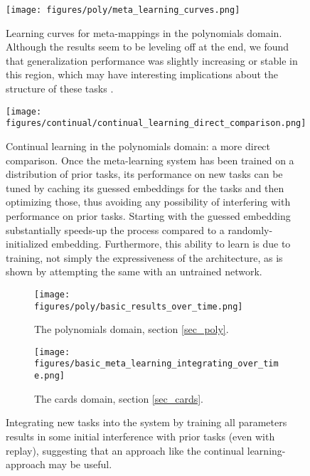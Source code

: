 \begin{figure}[H]
\centering
\texttt{[image: figures/poly/meta\_learning\_curves.png]}
\caption{Learning curves for meta-mappings in the polynomials domain. Although the results seem to be leveling off at the end, we found that generalization performance was slightly increasing or stable in this region, which may have interesting implications about the structure of these tasks \citep{Lampinen2019}.}
\label{supp_poly_meta_learning_curves}
\end{figure}

\begin{figure}[H]
\centering
\texttt{[image: figures/continual/continual\_learning\_direct\_comparison.png]}
\caption{Continual learning in the polynomials domain: a more direct comparison. Once the meta-learning system has been trained on a distribution of prior tasks, its performance on new tasks can be tuned by caching its guessed embeddings for the tasks and then optimizing those, thus avoiding any possibility of interfering with performance on prior tasks. Starting with the guessed embedding substantially speeds-up the process compared to a randomly-initialized embedding. Furthermore, this ability to learn is due to training, not simply the expressiveness of the architecture, as is shown by attempting the same with an untrained network.}
\label{supp_poly_continual_results}
\end{figure}

\begin{figure}[H]
\centering
\begin{subfigure}[t]{0.5\textwidth}
\texttt{[image: figures/poly/basic\_results\_over\_time.png]}
\caption{The polynomials domain, section \ref{sec_poly}.}
\label{supp_poly_integration_results}
\end{subfigure}%
\begin{subfigure}[t]{0.5\textwidth}
\texttt{[image: figures/basic\_meta\_learning\_integrating\_over\_time.png]}
\caption{The cards domain, section \ref{sec_cards}.}
\label{supp_cards_integration_results}
\end{subfigure}%
\caption{Integrating new tasks into the system by training all parameters results in some initial interference with prior tasks (even with replay), suggesting that an approach like the continual learning-approach may be useful.}
\label{supp_integration_results}
\end{figure}


